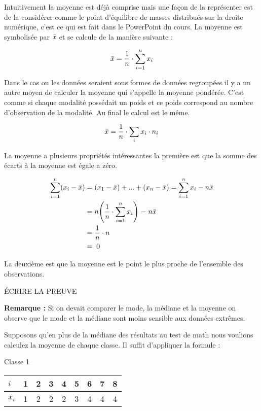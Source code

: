 \documentclass{report}
\begin{document}
Intuitivement la moyenne est déjà comprise mais une façon de la représenter est de la considérer comme le point d'équilibre de masses distribués sur la droite numérique, c'est ce qui est fait dans le PowerPoint du cours. La moyenne est symbolisée par $\Bar{x}$ et se calcule de la manière suivante :

\begin{align*}
  \Bar{x}=\frac{1}{n} \cdot \sum_{i=1}^n x_i
\end{align*}

Dans le cas ou les données seraient sous formes de données regroupées il y a un autre moyen de calculer la moyenne qui s'appelle la moyenne pondérée. C'est comme si chaque modalité possédait un poids et ce poids correspond au nombre d'observation de la modalité. Au final le calcul est le même.

\begin{align*}
  \Bar{x}=\frac{1}{n} \cdot \sum_{i} x_i \cdot n_i
\end{align*}

La moyenne a plusieurs propriétés intéressantes la première est que la somme des écarts à la moyenne est égale a zéro.

\begin{align*}
  \sum_{i=1}^n (x_i-\Bar{x}) &= (x_1-\Bar{x})+...+(x_n-\Bar{x})=\sum_{i=1}^n x_i-n\Bar{x} \\
 &= n\Biggl( \frac{1}{n} \cdot \sum_{i=1}^n x_i\Biggl) \; -  \; n\Bar{x} \\
 &= \frac{1}{n} \cdot n \\
 &= \;0
\end{align*}

La deuxième est que la moyenne est le point le plus proche de l'ensemble des observations.

ÉCRIRE LA PREUVE


\textbf{Remarque :} Si on devait comparer le mode, la médiane et la moyenne on observe que le mode et la médiane sont moins sensible aux données extrêmes.

Supposons qu'en plus de la médiane des résultats au test de math nous voulions calculez la moyenne de chaque classe. Il suffit d'appliquer la formule :

Classe 1

\begin{center}
\begin{tabular}{l c c c c c c c c} 
\hline
$i$&1&2&3&4&5&6&7&8 \\ 
\hline
$x_i$&1&2&2&2&3&4&4&4 \\
\hline
\end{tabular}
\end{center}
\end{document}
